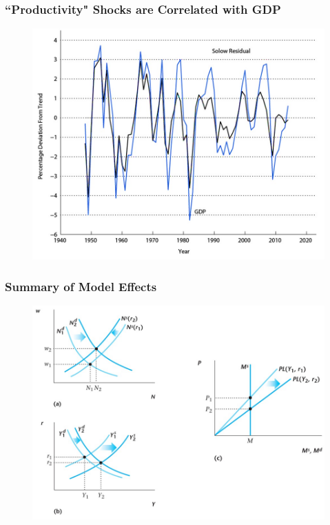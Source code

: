 \documentclass{beamer}
\begin{document}
\begin{frame}
\frametitle[alignment=center]{``Productivity" Shocks are Correlated with GDP}
\begin{figure}
\centering
\includegraphics[scale=0.65]{Figures/W_Fig_13pt1.png}
\end{figure}
\end{frame}


\begin{frame}
\frametitle[alignment=center]{Summary of Model Effects}
\begin{figure}
\centering
\includegraphics[scale=0.65]{Figures/W_Fig_13pt2.png}
\end{figure}
\end{frame}
\end{document}
